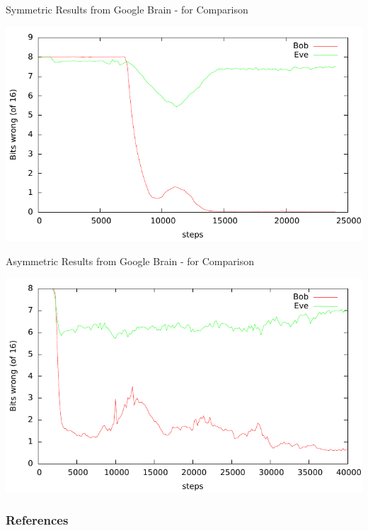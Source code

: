 \documentclass{beamer}
\begin{document}
		\begin{frame}{Symmetric Results from Google Brain - for Comparison}
			\begin{center}
				\includegraphics[height=0.8\textheight]{cryptolearn_batch_tighter}
			\end{center}
		\end{frame}
		\begin{frame}{Asymmetric Results from Google Brain - for Comparison}
			\begin{center}
				\includegraphics[height=0.8\textheight]{pubkey_bob_v_eve}
			\end{center}
		\end{frame}
		\begin{frame}
			\frametitle{References}
			
			
		\end{frame}
\end{document}
